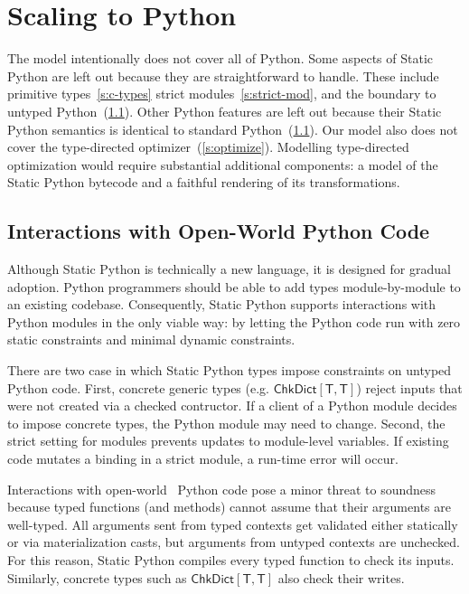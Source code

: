 \documentclass[english,cleveref,submission]{programming}
\newcommand{\SP}{Static Python}
\newcommand{\typefont}[1]{\mathsf{#1}}
\newcommand{\paramtype}[2]{#1[#2]}
\newcommand{\sptype}{\typefont{T}}
\newcommand{\sptchkdict}[2]{\paramtype{\typefont{ChkDict}}{#1, #2}}
\begin{document}
\section{Scaling to Python}
\label{s:impl}

The model intentionally does not cover all of Python.
Some aspects of \SP{} are left out because they are straightforward to
handle.
These include primitive types~\cref{s:c-types} strict modules~\cref{s:strict-mod},
and the boundary to untyped Python~(\cref{s:py-boundary}).
Other Python features are left out because their \SP{} semantics is identical
to standard Python~(\cref{s:py-boundary}).
Our model also does not cover the type-directed optimizer~(\cref{s:optimize}).
Modelling type-directed optimization would require substantial additional
components: a model of the \SP{} bytecode and a faithful rendering of its
transformations.


\subsection{Interactions with Open-World Python Code}
\label{s:py-boundary}

Although \SP{} is technically a new language, it is designed for gradual adoption.
Python programmers should be able to add types module-by-module to an
existing codebase.
Consequently, \SP{} supports interactions with Python modules in the only viable
way: by letting the Python code run with zero static constraints and minimal
dynamic constraints.

There are two case in which \SP{} types impose constraints on untyped Python code.
First, concrete generic types (e.g. $\sptchkdict{\sptype}{\sptype}$)
reject inputs that were not created via a checked contructor.
If a client of a Python module decides to impose concrete types, the Python module
may need to change.
Second, the strict setting for modules prevents updates to module-level variables.
If existing code mutates a binding in a strict module, a run-time error will
occur.

Interactions with {open-world}~\cite{vss-popl-2017} Python code pose a minor
threat to soundness because
typed functions (and methods) cannot assume that their arguments are
well-typed.
All arguments sent from typed contexts get validated either statically or
via materialization casts, but arguments from untyped contexts are unchecked.
For this reason, \SP{} compiles every typed function to check its inputs.
Similarly, concrete types such as $\sptchkdict{\sptype}{\sptype}$ also
check their writes.
\end{document}
